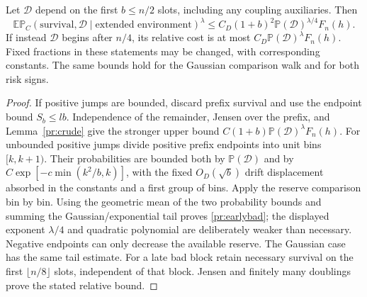 \begin{lemma}\label{pr:relativebad}
Let $\mathcal D$ depend on the first $b\le n/2$ slots, including any
coupling auxiliaries. Then
\begin{equation}
 \mathbb E\mathbb P_C(\text{survival},\mathcal D\mid
                  \text{extended environment})^\lambda
 \le C_D(1+b)^2\mathbb P(\mathcal D)^{\lambda/4}F_n(h).
 \label{pr:earlybad}
\end{equation}
If instead $\mathcal D$ begins after $n/4$, its relative cost is at most
$C_D\mathbb P(\mathcal D)^\lambda F_n(h)$. Fixed fractions in these
statements may be changed, with corresponding constants. The same
bounds hold for the Gaussian comparison walk and for both risk signs.
\end{lemma}
\begin{proof}
If positive jumps are bounded, discard prefix survival and use the
endpoint bound $S_b\le lb$. Independence of the remainder, Jensen over
the prefix, and Lemma~\ref{pr:crude} give the stronger upper bound
$C(1+b)\mathbb P(\mathcal D)^\lambda F_n(h)$.
For unbounded positive jumps divide positive prefix endpoints into unit
bins $[k,k+1)$. Their probabilities are bounded both by
$\mathbb P(\mathcal D)$ and by
$C\exp[-c\min(k^2/b,k)]$, with the fixed $O_D(\sqrt b)$ drift displacement
absorbed in the constants and a first group of bins. Apply the reserve
comparison bin by bin. Using the geometric mean of the two probability
bounds and summing the Gaussian/exponential tail proves
\eqref{pr:earlybad}; the displayed exponent $\lambda/4$ and quadratic
polynomial are deliberately weaker than necessary. Negative endpoints
can only decrease the available reserve. The Gaussian case has the same
tail estimate. For a late bad block retain necessary survival on the
first $\lfloor n/8\rfloor$ slots, independent of that block. Jensen and
finitely many doublings prove the stated relative bound.
\end{proof}

